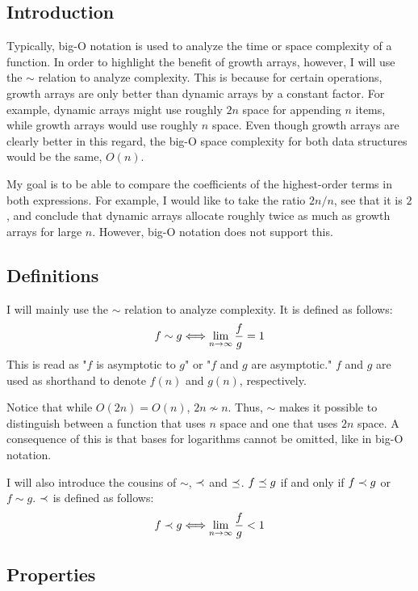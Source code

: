 \subsection{Introduction}

Typically, big-O notation is used to analyze the time or space complexity of a function. In order to highlight the benefit of growth arrays, however, I will use the $\sim$ relation to analyze complexity. This is because for certain operations, growth arrays are only better than dynamic arrays by a constant factor. For example, dynamic arrays might use roughly $2n$ space for appending $n$ items, while growth arrays would use roughly $n$ space. Even though growth arrays are clearly better in this regard, the big-O space complexity for both data structures would be the same, $O(n)$.

My goal is to be able to compare the coefficients of the highest-order terms in both expressions. For example, I would like to take the ratio $2n / n$, see that it is $2$, and conclude that dynamic arrays allocate roughly twice as much as growth arrays for large $n$. However, big-O notation does not support this.

\subsection{Definitions}

I will mainly use the $\sim$ relation to analyze complexity. It is defined as follows:
\begin{align*}
f \sim g \Longleftrightarrow \lim_{n \to \infty} \frac f g = 1
\end{align*}
This is read as "$f$ is asymptotic to $g$" or "$f$ and $g$ are asymptotic." {\HdrNote} $f$ and $g$ are used as shorthand to denote $f(n)$ and $g(n)$, respectively.

Notice that while $O(2n) = O(n)$, $2n \not\sim n$. Thus, $\sim$ makes it possible to distinguish between a function that uses $n$ space and one that uses $2n$ space. {\HdrNote} A consequence of this is that bases for logarithms cannot be omitted, like in big-O notation.

I will also introduce the cousins of $\sim$, $\prec$ and $\preceq$. $f \preceq g$ if and only if $f \prec g$ or $f \sim g$. $\prec$ is defined as follows:
\begin{align*}
f \prec g \Longleftrightarrow \lim_{n \to \infty} \frac f g < 1
\end{align*}
\subsection{Properties}
\label{subsec:AsymptoticProperties}

